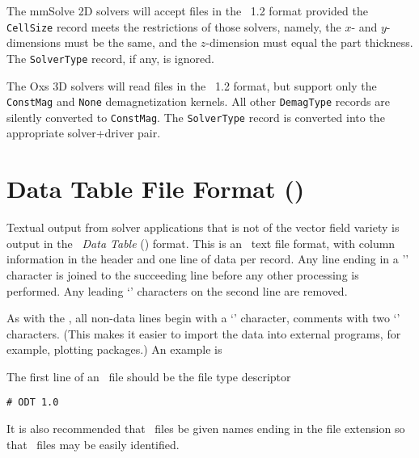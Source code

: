 The mmSolve 2D solvers will accept files in the \MIF~1.2 format provided
the \texttt{CellSize} record meets the restrictions of those solvers,
namely, the $x$- and $y$-dimensions must be the same, and the
$z$-dimension must equal the part thickness.  The \texttt{SolverType}
record, if any, is ignored.

The Oxs 3D solvers will read files in the \MIF~1.2 format, but support
only the \texttt{ConstMag} and \texttt{None} demagnetization kernels.
All other \texttt{DemagType} records are silently converted
to \texttt{ConstMag}.  The \texttt{SolverType} record is converted into
the appropriate solver+driver pair.

\section{Data Table File Format (\ODT)}\label{sec:odtformat}
Textual output from solver applications that is not of the vector field
variety is output in the {\em \OOMMF\ Data Table} (\ODT)
format.  This is an \ASCII\ text file format,
with column information in the header and one line of data per record.
Any line ending in a '\bs' character is joined to the succeeding
line before any other processing is performed.  Any leading `\lb'
characters on the second line are removed.

As with the , all non-data lines begin with a `\lb'
character, comments with two `\lb' characters.  (This makes it easier
to import the data into external programs, for example, plotting
packages.)  An example is 

The first line of an \ODT\ file should be the file type descriptor
\begin{verbatim}
# ODT 1.0
\end{verbatim}
It is also recommended that \ODT\ files be given names ending
in the file extension  so that \ODT\ files may be
easily identified.

